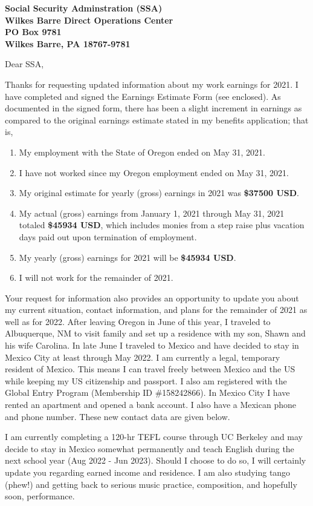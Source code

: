 \documentclass[11pt]{letter} %
\begin{document}
\begin{letter}{\large \bfseries Social Security Adminstration (SSA) \\ Wilkes Barre Direct Operations Center \\ PO Box 9781 \\ Wilkes Barre, PA 18767-9781}
\opening{Dear SSA,}

Thanks for requesting updated information about my work earnings for 2021. I have completed and signed the Earnings Estimate Form (see enclosed). As documented in the signed form, there has been a slight increment in earnings as compared to the original earnings estimate stated in my benefits application; that is, \\
\begin{enumerate}
  \item My employment with the State of Oregon ended on May 31, 2021.
  \item I have not worked since my Oregon employment ended on May 31, 2021.
  \item My original estimate for yearly (gross) earnings in 2021 was \textbf{\$37500 USD}.
  \item My actual (gross) earnings from January 1, 2021 through May 31, 2021 totaled \textbf{\$45934 USD}, which includes monies from a step raise plus vacation days paid out upon termination of employment.
  \item My yearly (gross) earnings for 2021 will be \textbf{\$45934 USD}.
  \item I will not work for the remainder of 2021.
\end{enumerate}

Your request for information also provides an opportunity to update you about my current situation, contact information, and plans for the remainder of 2021 as well as for 2022. After leaving Oregon in June of this year, I traveled to Albuquerque, NM to visit family and set up a residence with my son, Shawn and his wife Carolina. In late June I traveled to Mexico and have decided to stay in Mexico City at least through May 2022. I am currently a legal, temporary resident of Mexico. This means I can travel freely between Mexico and the US while keeping my US citizenship and passport. I also am registered with the Global Entry Program (Membership ID \#158242866). In Mexico City I have rented an apartment and opened a bank account.  I also have a Mexican phone and phone number. These new contact data are given below. 

I am currently completing a 120-hr TEFL course through UC Berkeley and may decide to stay in Mexico somewhat permanently and teach English during the next school year (Aug 2022 - Jun 2023). Should I choose to do so, I will certainly update you regarding earned income and residence. I am also studying tango (phew!) and getting back to serious music practice, composition, and hopefully soon, performance. \\


\end{letter}
\end{document}
